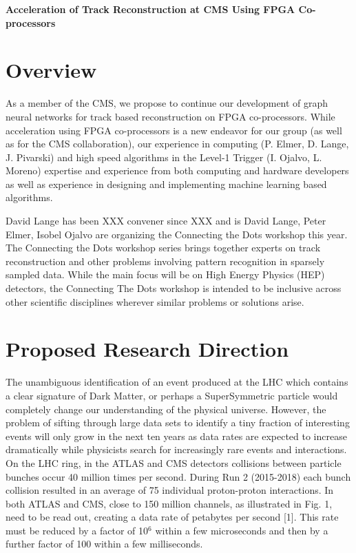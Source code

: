 \documentclass[preprint,12pt]{elsarticle}
\begin{document}





\noindent
\textbf{Acceleration of Track Reconstruction at CMS Using FPGA Co-processors}

\section{Overview}
\label{S:1}
As a member of the CMS, we propose to continue our development of graph neural
networks for track based reconstruction on FPGA co-processors.
While acceleration using FPGA co-processors is a new endeavor for our group 
(as well as for the CMS collaboration), 
our experience in computing (P. Elmer, D. Lange, J. Pivarski) and 
high speed algorithms in the Level-1 Trigger (I. Ojalvo, L. Moreno)
expertise and experience from both computing and hardware 
developers as well as experience in designing and implementing
machine learning based algorithms. %

David Lange has been XXX convener since XXX and is 
David Lange, Peter Elmer, Isobel Ojalvo are organizing the Connecting the Dots
workshop this year. The Connecting the Dots workshop series brings together 
experts on track reconstruction and other problems involving pattern recognition 
in sparsely sampled data. While the main focus will be on High Energy Physics (HEP) 
detectors, the Connecting The Dots workshop is intended to be inclusive across other
scientific disciplines wherever similar problems or solutions arise. 

\section{Proposed Research Direction}
The unambiguous identification of an event produced at the 
LHC which contains a clear signature of Dark Matter, or perhaps 
a SuperSymmetric particle would completely change our understanding 
of the physical universe. However, the problem of sifting through 
large data sets to identify a tiny fraction of interesting events 
will only grow in the next ten years as data rates are expected to 
increase dramatically while physicists search for increasingly rare 
events and interactions. On the LHC ring, in the ATLAS and CMS detectors 
collisions between particle bunches occur 40 million times per second. 
During Run 2 (2015-2018) each bunch collision resulted in an average of 
75 individual proton-proton interactions. In both ATLAS and CMS, close 
to 150 million channels, as illustrated in Fig. 1, need to be read out, 
creating a data rate of petabytes per second [1]. This rate must be 
reduced by a factor of 10$^{6}$ within a few microseconds and then 
by a further factor of 100 within a few milliseconds.
\end{document}

